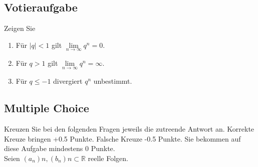 \documentclass[a4paper]{article}
\begin{document}
\setcounter{section}{4}
\subsection{Votieraufgabe}
Zeigen Sie
\begin{enumerate}[label=({\alph*})]
    \item Für $|q| < 1$ gilt $\lim\limits_{n\to\infty}q^n=0$.
    \item Für $q > 1$ gilt $\lim\limits_{n\to\infty}q^n = \infty$.
    \item Für $q\leq -1$ divergiert $q^n$ unbestimmt.
\end{enumerate}

\subsection{Multiple Choice}
Kreuzen Sie bei den folgenden Fragen jeweils die zutreende Antwort an. Korrekte Kreuze bringen +0.5 Punkte. Falsche Kreuze -0.5 Punkte. Sie bekommen auf diese Aufgabe mindestens 0 Punkte.\\
Seien $(a_n)n, (b_n)n \subset \mathbb{R}$ reelle Folgen.
\end{document}
